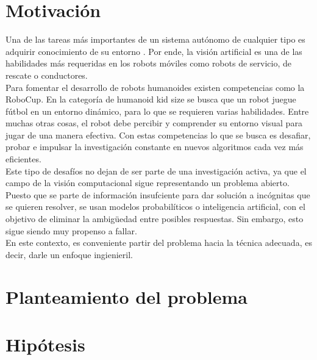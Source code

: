 \section{Motivación}
Una de las tareas más importantes de un sistema autónomo de cualquier tipo es adquirir conocimiento de su entorno\cite{siegwart2011introduction} . Por ende, la visión artificial es una de las habilidades más requeridas en los robots móviles como robots de servicio, de rescate o conductores.
\\
Para fomentar el desarrollo de robots humanoides existen competencias como la RoboCup. En la categoría de humanoid kid size se busca  que un robot juegue fútbol en un entorno dinámico, para lo que se requieren varias habilidades. Entre muchas otras cosas, el robot debe percibir y comprender su entorno visual para jugar de una manera efectiva. Con estas competencias lo que se busca es desafiar, probar e impulsar la investigación constante en nuevos algoritmos cada vez más eficientes. \cite{fiedler2019open} \\Este tipo de desafíos no dejan de ser parte de una investigación activa, ya que el campo de la visión computacional sigue representando un problema abierto. Puesto que se parte de información insufciente para dar solución a incógnitas que se quieren resolver, se usan modelos probabilíticos o inteligencia artificial, con el objetivo de eliminar la ambigüedad entre posibles respuestas. Sin embargo, esto sigue siendo muy propenso a fallar.\\ En este contexto, es conveniente partir del problema hacia la técnica adecuada, es decir, darle un enfoque ingienieril. \cite{szeliski2022computer}

\section{Planteamiento del problema}

\section{Hipótesis}

